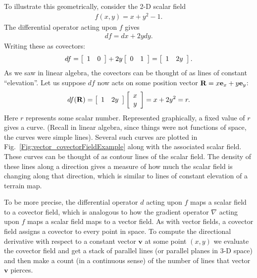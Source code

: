 To illustrate this geometrically, consider the 2-D scalar field 
\begin{align}
  f(x,y) = x + y^2 - 1. 
\end{align}
The differential operator acting upon $f$ gives
\begin{align}
  df = dx + 2y dy. 
\end{align}
Writing these as covectors:
\begin{align}
  df = \left[ \begin{array}{c c} 1 & 0 \\ \end{array} \right] + 2 y \left[ \begin{array}{c c} 0 & 1 \\ \end{array} \right]  = \left[ \begin{array}{c c} 1 & 2y \\ \end{array} \right].
\end{align}
As we saw in linear algebra, the covectors can be thought of as lines of constant ``elevation''. Let us suppose $df$ now acts on some position vector $\mathbf{R} = x \mathbf{e}_x + y \mathbf{e}_y$:
\begin{align}
  df(\mathbf{R}) = \left[ \begin{array}{c c} 1 & 2y \\ \end{array} \right]
  \left[ \begin{array}{c} x \\ y \\ \end{array} \right] = x + 2y^2 = r.
\end{align}
Here $r$ represents some scalar number. Represented graphically, a fixed value of $r$ gives a curve. (Recall in linear algebra, since things were not functions of space, the curves were simple lines). Several such curves are plotted in Fig.~\ref{Fig:vector_covectorFieldExample} along with the associated scalar field. These curves can be thought of as contour lines of the scalar field. The density of these lines along a direction gives a measure of how much the scalar field is changing along that direction, which is similar to lines of constant elevation of a terrain map.

To be more precise, the differential operator $d$ acting upon $f$ maps a scalar field to a covector field, which is analogous to how the gradient operator $\nabla$ acting upon $f$ maps a scalar field maps to a vector field. As with vector fields, a covector field assigns a covector to every point in space. To compute the directional derivative with respect to a constant vector $\mathbf{v}$ at some point $(x,y)$ we evaluate the covector field and get a stack of parallel lines (or parallel planes in 3-D space) and then make a count (in a continuous sense) of the number of lines that vector $\mathbf{v}$ pierces.

